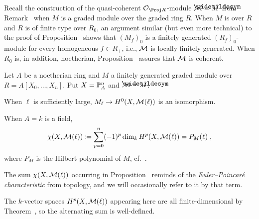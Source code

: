 \documentclass[a4paper,parskip=half,numbers=enddot, DIV=12]{scrreprt}
\begin{document}
Recall the construction of the quasi-coherent $\Oo_{\Proj R}$-module $\Mm=\snake{M}$ from Remark~ when $M$ is a graded module over the graded ring $R$. When $M$ is over $R$ and $R$ is of finite type over $R_0$, an argument similar (but even more technical) to the proof of Proposition~ shows that $(M_f)_0$ is a finitely generated $(R_f)_0$-module for every homogeneous $f\in R_+$, i.e., $\mathcal{M}$ is locally finitely generated. When $R_0$ is, in addition, noetherian, Proposition~ assures that $\mathcal{M}$ is coherent.
\begin{prop}[Serre]
	Let $A$ be a noetherian ring and $M$ a finitely generated graded module over $R=A[X_0,\ldots,X_n]$. Put $X=\mathbb{P}_A^n$ and $\Mm=\snake{M}$.
	\begin{alphanumerate}
		\item When $\ell$ is sufficiently large, $M_\ell\morphism H^0(X,\Mm(\ell))$ is an isomorphism.
		\item When $A=k$ is a field,
		\begin{align*}
			\chi(X,\mathcal{M}(\ell))\coloneqq\sum_{p=0}^{n}(-1)^p\dim_kH^p(X,\mathcal{M}(\ell))=P_M(\ell)\;,
		\end{align*}
		where $P_M$ is the Hilbert polynomial of $M$, cf.\ \cite[Definition~3.1.3]{alg2}.
	\end{alphanumerate}
\end{prop}
\begin{rem*}
	\begin{alphanumerate}
		\item The sum $\chi(X,\mathcal{M}(\ell))$ occurring in Proposition~ reminds of the \emph{Euler--Poincaré characteristic} from topology, and we will occasionally refer to it by that term.
		\item The $k$-vector spaces $H^p(X,\mathcal{M}(\ell))$ appearing here are all finite-dimensional by Theorem~, so the alternating sum is well-defined.
	\end{alphanumerate}
\end{rem*}
\end{document}
